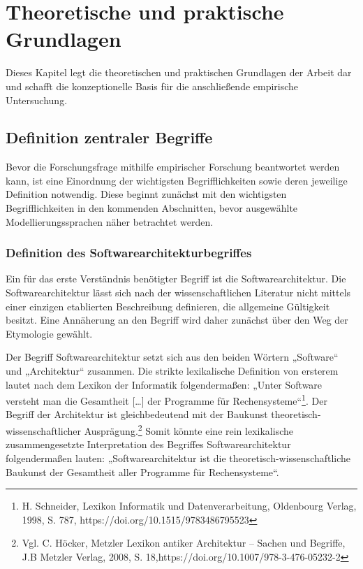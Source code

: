 

\lstset{language=C}

\chapter{Theoretische und praktische Grundlagen }

Dieses Kapitel legt die theoretischen und praktischen Grundlagen der Arbeit dar und schafft die konzeptionelle Basis für die anschließende empirische Untersuchung.

\section{Definition zentraler Begriffe}

Bevor die Forschungsfrage mithilfe empirischer Forschung beantwortet werden kann, ist eine Einordnung der wichtigsten Begrifflichkeiten sowie deren jeweilige Definition notwendig. Diese beginnt zunächst mit den wichtigsten Begrifflichkeiten in den kommenden Abschnitten, bevor ausgewählte Modellierungssprachen  näher betrachtet werden.

\subsection{Definition des Softwarearchitekturbegriffes}

Ein für das erste Verständnis benötigter Begriff ist die Softwarearchitektur. 
Die Softwarearchitektur lässt sich nach der wissenschaftlichen Literatur nicht mittels einer einzigen etablierten Beschreibung definieren, die allgemeine Gültigkeit besitzt. Eine Annäherung an den Begriff wird daher zunächst über den Weg der Etymologie gewählt.

Der Begriff Softwarearchitektur setzt sich aus den beiden Wörtern „Software“ und „Architektur“ zusammen. Die strikte lexikalische Definition von ersterem lautet nach dem Lexikon der Informatik folgendermaßen:
„Unter Software versteht man die Gesamtheit […] der Programme für Rechensysteme“\footnote{ H. Schneider, Lexikon Informatik und Datenverarbeitung, Oldenbourg Verlag, 1998, S. 787, https://doi.org/10.1515/9783486795523}.
Der Begriff der Architektur ist gleichbedeutend mit der Baukunst theoretisch-wissenschaftlicher Ausprägung.\footnote{Vgl. C. Höcker, Metzler Lexikon antiker Architektur – Sachen und Begriffe, J.B Metzler Verlag, 2008, S. 18,https://doi.org/10.1007/978-3-476-05232-2} 
Somit könnte eine rein lexikalische zusammengesetzte Interpretation des Begriffes Softwarearchitektur folgendermaßen lauten: „Softwarearchitektur ist die theoretisch-wissenschaftliche Baukunst der Gesamtheit aller Programme für Rechensysteme“.

